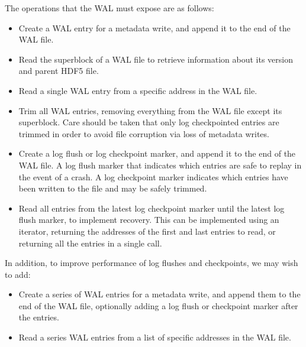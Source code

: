 The operations that the WAL must expose are as follows:

\begin{itemize}
    \item Create a WAL entry for a metadata write, and append it to the end of the WAL file. 
    
    \item Read the superblock of a WAL file to retrieve information about its version and parent HDF5 file.

    \item Read a single WAL entry from a specific address in the WAL file.

    \item Trim all WAL entries, removing everything from the WAL file except its superblock. Care should be taken that only log checkpointed entries are trimmed in order to avoid file corruption via loss of metadata writes.

    \item Create a log flush or log checkpoint marker, and append it to the end of the WAL file. A log flush marker that indicates which entries are safe to replay in the event of a crash. A log checkpoint marker indicates which entries have been written to the file and may be safely trimmed.

    \item Read all entries from the latest log checkpoint marker until the latest log flush marker, to implement recovery. This can be implemented using an iterator, returning the addresses of the first and last entries to read, or returning all the entries in a single call.

\end{itemize}

In addition, to improve performance of log flushes and checkpoints, we may wish to add:

\begin{itemize}
    \item Create a series of WAL entries for a metadata write, and append them to the end of the WAL file, optionally adding a log flush or checkpoint marker after the entries.

    \item Read a series WAL entries from a list of specific addresses in the WAL file.

\end{itemize}
